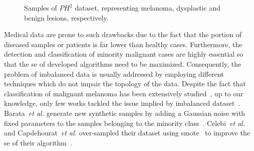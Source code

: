 \begin{figure}
\begin{center}
  \hspace*{\fill}
  \hfill
  \hfill
  \hspace*{\fill}
  \caption{Samples of $PH^2$ dataset, representing melanoma, dysplastic and benign lesions, respectively.}
  \label{fig:PH2samples}
\end{center}	
\end{figure}

Medical data are prone to such drawbacks due to the fact that the portion of diseased samples or patients is far lower than healthy cases.
Furthermore, the detection and classification of minority malignant cases are highly essential so that the \ac{se} of developed algorithms need to be maximized.
Consequently, the problem of imbalanced data is usually addressed by employing different techniques which do not impair the topology of the data.
Despite the fact that classification of malignant melanoma has been extensively studied~\cite{rastgoo2015automatic}, up to our knowledge, only few works tackled the issue implied by imbalanced dataset~\cite{barata2013two,celebi2007methodological}.
Barata~\emph{et al.} generate new synthetic samples by adding a Gaussian noise with fixed parameters to the samples belonging to the minority class~\cite{barata2013two}.
Celebi~\emph{et al.} and Capdehourat~\emph{et al.} over-sampled their dataset using \ac{smote}~\cite{chawla2002smote} to improve the \ac{se} of their algorithm~\cite{celebi2007methodological, capdehourat2009pigmented}.

